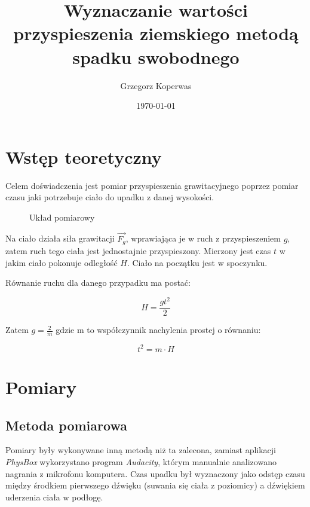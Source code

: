 \documentclass[a4paper,12pt]{article}
\title{Wyznaczanie wartości przyspieszenia ziemskiego metodą spadku swobodnego}
\author{Grzegorz Koperwas}
\date{\today}
\begin{document}


\section{Wstęp teoretyczny}

Celem doświadczenia jest pomiar przyspieszenia grawitacyjnego poprzez pomiar czasu jaki potrzebuje ciało do upadku z danej wysokości.

\begin{figure}[h]
	\centering 
	\caption{Układ pomiarowy}
\end{figure}

Na ciało działa siła grawitacji $\vec{F_g}$, wprawiająca je w ruch z przyspieszeniem $g$, zatem ruch tego ciała jest jednostajnie przyspieszony. Mierzony jest czas $t$ w jakim ciało pokonuje odległość $H$. Ciało na początku jest w spoczynku.

Równanie ruchu dla danego przypadku ma postać:

\[ H = \frac{gt^2}{2} \]

Zatem $g = \frac{2}{m}$ gdzie m to współczynnik nachylenia prostej o równaniu:

\begin{equation}
	t^2 = m \cdot H
\end{equation}

\clearpage
\section{Pomiary}

\subsection*{Metoda pomiarowa}

Pomiary były wykonywane inną metodą niż ta zalecona, zamiast aplikacji \emph{PhysBox} wykorzystano program \emph{Audacity}, którym manualnie analizowano nagrania z mikrofonu komputera. Czas upadku był wyznaczony jako odstęp czasu między środkiem pierwszego dźwięku (suwania się ciała z poziomicy) a dźwiękiem uderzenia ciała w podłogę.
\end{document}

